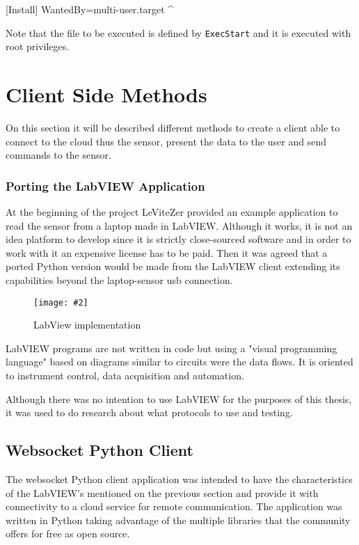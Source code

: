 \documentclass[hidelinks,11pt,a4paper,oneside,article]{memoir}
\newcommand{\putimage}[3][10] %
{
\begin{figure}[h]
	\centering
	\captionsetup{justification=centering}
	\texttt{[image: \#2]}
	\caption{#3}
	\label{fig:#2}
\end{figure}
}
\begin{document}
[Install]
WantedBy=multi-user.target
^

Note that the file to be executed is defined by \texttt{ExecStart} and it is executed with root privileges.


\section{Client Side Methods}\label{sec:client-application-methods}
On this section it will be described different methods to create a client able to connect to the cloud thus the sensor, present the data to the user and send commands to the sensor.

\subsubsection{Porting the LabVIEW Application}
At the beginning of the project LeViteZer provided an example application to read the sensor from a laptop made in LabVIEW. Although it works, it is not an idea platform to develop since it is strictly close-sourced software and in order to work with it an expensive license has to be paid. Then it was agreed that a ported Python version would be made from the LabVIEW client extending its capabilities beyond the laptop-sensor \gls{usb} connection.

    \putimage{labview}{LabView implementation}
    
LabVIEW programs are not written in code but using a "visual programming language" based on diagrams similar to circuits were the data flows. It is oriented to instrument control, data acquisition and  automation.~\cite{labview}

Although there was no intention to use LabVIEW for the purposes of this thesis, it was used to do research about what protocols to use and testing.


\subsection{Websocket Python Client}\label{sec:websocket-python-client}
The websocket Python client application was intended to have the characteristics of the LabVIEW's mentioned on the previous section and provide it with connectivity to a cloud service for remote communication. The application was written in Python taking advantage of the multiple libraries that the community offers for free as open source.
\end{document}
